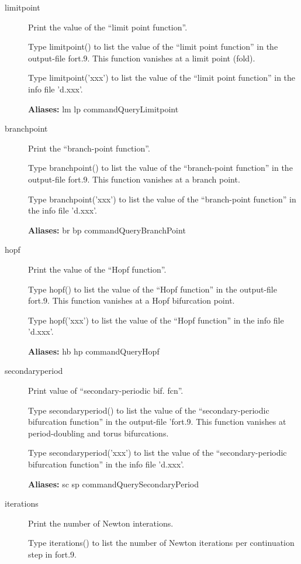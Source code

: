 \documentclass[12pt]{report}
\begin{document}
\begin{description}
\item[limitpoint]
Print the value of the ``limit point function''.

    Type limitpoint() to list the value of the ``limit point function'' 
    in the output-file fort.9. This function
    vanishes at a limit point (fold).

    Type limitpoint('xxx') to list the value of the ``limit point function'' 
    in the info file 'd.xxx'.
    
\textbf{Aliases:} lm lp commandQueryLimitpoint

\item[branchpoint]
Print the ``branch-point function''.
    
    Type branchpoint() to list the value of the ``branch-point function'' 
    in the output-file fort.9. This function vanishes at a branch point.
    
    Type branchpoint('xxx') to list the value of the ``branch-point function''
    in the info file 'd.xxx'.
    
\textbf{Aliases:} br bp commandQueryBranchPoint

\item[hopf]
Print the value of the ``Hopf function''.

    Type hopf() to list the value of the ``Hopf function'' 
    in the output-file fort.9. This function
    vanishes at a Hopf bifurcation point.

    Type hopf('xxx') to list the value of the ``Hopf function''
    in the info file 'd.xxx'.
    
\textbf{Aliases:} hb hp commandQueryHopf

\item[secondaryperiod]
Print value of ``secondary-periodic bif. fcn''.

    Type secondaryperiod()  to list the value of the
    ``secondary-periodic bifurcation function'' 
    in the output-file 'fort.9. This function
    vanishes at period-doubling and torus bifurcations.

    Type secondaryperiod('xxx') to list the value of the
    ``secondary-periodic bifurcation function''
    in the info file 'd.xxx'.
    
\textbf{Aliases:} sc sp commandQuerySecondaryPeriod

\item[iterations]
Print the number of Newton interations.

    Type iterations() to list the number of Newton iterations per
    continuation step in fort.9. 


\end{description}
\end{document}
